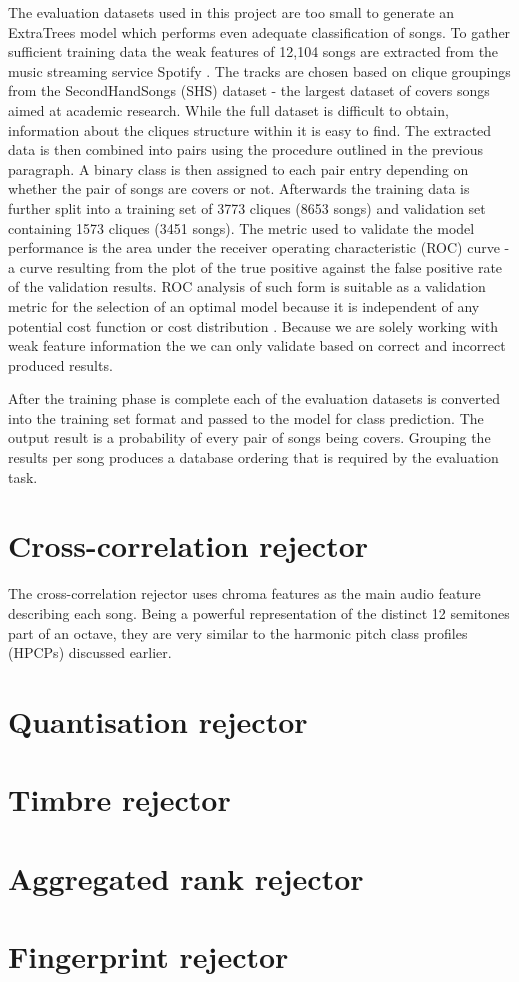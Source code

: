 The evaluation datasets used in this project are too small to generate an
ExtraTrees model which performs even adequate classification of songs. To gather
sufficient training data the weak features of 12,104 songs are extracted from
the music streaming service Spotify \cite{spotify}. The tracks are chosen based
on clique groupings from the SecondHandSongs (SHS) \cite{shs} dataset - the
largest dataset of covers songs aimed at academic research. While the full
dataset is difficult to obtain, information about the cliques structure within
it is easy to find. The extracted data is then combined into pairs using the
procedure outlined in the previous paragraph. A binary class is then assigned to
each pair entry depending on whether the pair of songs are covers or not.
Afterwards the training data is further split into a training set of 3773
cliques (8653 songs) and validation set containing 1573 cliques (3451 songs).
The metric used to validate the model performance is the area under the receiver
operating characteristic (ROC) curve - a curve resulting from the plot of the
true positive against the false positive rate of the validation results. ROC
analysis of such form is suitable as a validation metric for the selection of an
optimal model because it is independent of any potential cost function or cost
distribution \cite{wiki:roc}. Because we are solely working with weak feature
information the we can only validate based on correct and incorrect produced results.

After the training phase is complete each of the evaluation datasets is
converted into the training set format and passed to the model for class
prediction. The output result is a probability of every pair of songs being
covers. Grouping the results per song produces a database ordering that is
required by the evaluation task.
\section{Cross-correlation rejector} 
\label{sec:weakfeatures}
The cross-correlation rejector uses chroma features as the main audio feature
describing each song. Being a powerful representation of the distinct 12
semitones part of an octave, they are very similar to the harmonic pitch class
profiles (HPCPs) discussed earlier. 
\section{Quantisation rejector} 
\label{sec:ccs}
\section{Timbre rejector} 
\label{sec:quantisation}
\section{Aggregated rank rejector} 
\label{sec:timbre}
\section{Fingerprint rejector} 
\label{sec:rankaggregation}


